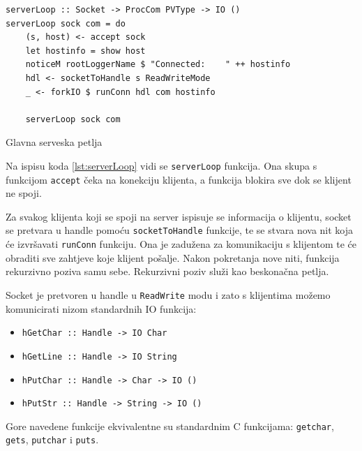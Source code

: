 \begin{listing}[H]
\centering
\begin{verbatim}
serverLoop :: Socket -> ProcCom PVType -> IO ()
serverLoop sock com = do
    (s, host) <- accept sock
    let hostinfo = show host
    noticeM rootLoggerName $ "Connected:    " ++ hostinfo
    hdl <- socketToHandle s ReadWriteMode
    _ <- forkIO $ runConn hdl com hostinfo

    serverLoop sock com
\end{verbatim}
\caption{Glavna serveska petlja}
\label{lst:serverLoop}
\end{listing}

Na ispisu koda \ref{lst:serverLoop} vidi se \texttt{serverLoop}
funkcija. Ona skupa s funkcijom \texttt{accept} čeka na konekciju
klijenta, a funkcija blokira sve dok se klijent ne spoji.

Za svakog klijenta koji se spoji na server ispisuje se informacija o klijentu,
socket se pretvara u handle pomoću \texttt{socketToHandle} funkcije,
te se stvara nova nit koja će izvršavati \texttt{runConn} funkciju.
Ona je zadužena za komunikaciju s klijentom te će obraditi sve zahtjeve koje
klijent pošalje. Nakon pokretanja nove niti, funkcija rekurzivno poziva samu
sebe. Rekurzivni poziv služi kao beskonačna petlja.

Socket je pretvoren u handle u \texttt{ReadWrite} modu i zato s
klijentima možemo komunicirati nizom standardnih IO funkcija:

\begin{itemize}
    \item \texttt{hGetChar :: Handle -> IO Char}
    \item \texttt{hGetLine :: Handle -> IO String}
    \item \texttt{hPutChar :: Handle -> Char -> IO ()}
    \item \texttt{hPutStr  :: Handle -> String -> IO ()}
\end{itemize}

Gore navedene funkcije ekvivalentne su standardnim C funkcijama:
\texttt{getchar}, \texttt{gets},
\texttt{putchar} i \texttt{puts}.

